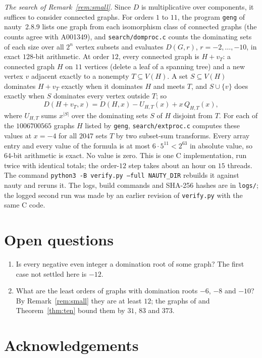 \documentclass[11pt]{amsart}
\theoremstyle{remark}
\begin{document}
\emph{The search of Remark~\ref{rem:small}.} Since $D$ is multiplicative over
components, it suffices to consider connected graphs. For orders $1$ to $11$,
the program \texttt{geng} of nauty~2.8.9 \cite{MP14} lists one graph from each
isomorphism class of connected graphs (the counts agree with A001349), and
\texttt{search/domproc.c} counts the dominating sets of each size over all
$2^n$ vertex subsets and evaluates $D(G,r)$, $r=-2,\dots,-10$, in exact $128$-bit
arithmetic. At order $12$, every connected graph is $H+v_T$: a connected graph
$H$ on $11$ vertices (delete a leaf of a spanning tree) and a new vertex $v$
adjacent exactly to a nonempty $T\subseteq V(H)$. A set $S\subseteq V(H)$
dominates $H+v_T$ exactly when it dominates $H$ and meets $T$, and
$S\cup\{v\}$ does exactly when $S$ dominates every vertex outside $T$; so
\[
  D(H+v_T,x)=D(H,x)-U_{H,T}(x)+x\,Q_{H,T}(x),
\]
where $U_{H,T}$ sums $x^{|S|}$ over the dominating sets $S$ of $H$ disjoint from
$T$. For each of the $1006700565$ graphs $H$ listed by \texttt{geng},
\texttt{search/extproc.c} computes these values at $x=-4$ for all $2047$ sets
$T$ by two subset-sum transforms. Every array entry and every value of the
formula is at most $6\cdot5^{11}<2^{63}$ in absolute value, so $64$-bit
arithmetic is exact. No value is zero. This is one C implementation, run twice
with identical totals; the order-$12$ step takes about an hour on $15$
threads. The command
\texttt{python3 -B verify.py --full NAUTY\_DIR} rebuilds it against nauty and
reruns it. The logs, build commands and SHA-256 hashes are in \texttt{logs/};
the logged second run was made by an earlier revision of \texttt{verify.py}
with the same C code.

\section{Open questions}

\begin{enumerate}
\item Is every negative even integer a domination root of some graph? The
  first case not settled here is $-12$.
\item What are the least orders of graphs with domination roots $-6$, $-8$ and
  $-10$? By Remark~\ref{rem:small} they are at least $12$; the graphs of
  \cite{MA26} and Theorem~\ref{thm:ten} bound them by $31$, $83$ and $373$.
\end{enumerate}

\section*{Acknowledgements}
\end{document}
